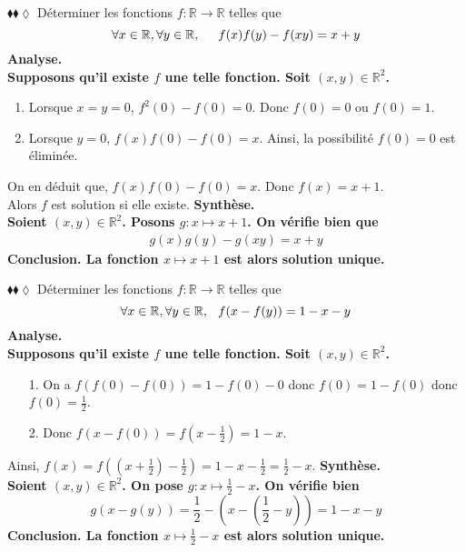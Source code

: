 \documentclass[11pt]{article}
\begin{document}
\begin{exercice}{$\blacklozenge\blacklozenge\lozenge$}{}
    Déterminer les fonctions $f: \mathbb{R} \rightarrow \mathbb{R}$ telles que 
    \begin{equation*}
        \forall{x\in\mathbb{R},\forall{y\in\mathbb{R}}, \hspace{0.5cm} f(x)f(y) - f(xy) = x + y}
    \end{equation*}
    \tcblower
    \bf{Analyse.}\\
    Supposons qu'il existe $f$ une telle fonction. Soit $(x,y)\in\mathbb{R}^2$.
    \begin{enumerate}[topsep=0pt,itemsep=-0.9 ex]
        \item Lorsque $x=y=0$, $f^2(0)-f(0)=0$. Donc $f(0) = 0$ ou $f(0) = 1$.
        \item Lorsque $y=0$, $f(x)f(0)-f(0)=x$. Ainsi, la possibilité $f(0)=0$ est éliminée.
    \end{enumerate}
    On en déduit que, $f(x)f(0)-f(0)=x$. Donc $f(x)=x+1$.\\
    Alors $f$ est solution si elle existe.\n
    \bf{Synthèse.}\\
    Soient $(x,y)\in\mathbb{R}^2$. Posons $g:x\mapsto x+1$. On vérifie bien que
    \begin{align*}
        g(x)g(y)-g(xy)=x+y
    \end{align*}
    \bf{Conclusion.} La fonction $x\mapsto x+1$ est alors solution unique.
\end{exercice}

\begin{exercice}{$\blacklozenge\blacklozenge\lozenge$}{}
    Déterminer les fonctions $f: \mathbb{R} \rightarrow \mathbb{R}$ telles que 
    \begin{equation*}
        \forall{x\in\mathbb{R}},\forall{y\in\mathbb{R}}, \hspace{0.25cm} f(x-f(y)) = 1-x-y
    \end{equation*}
    \tcblower
    \bf{Analyse.}\\
    Supposons qu'il existe $f$ une telle fonction. Soit $(x,y)\in\mathbb{R}^2$.
    \begin{itemize}[topsep=0pt,itemsep=-0.9 ex]
        \item[1.] On a $f(f(0)-f(0))=1-f(0)-0$ donc $f(0)=1-f(0)$ donc $f(0)=\frac{1}{2}$.
        \item[2.] Donc $f(x-f(0))=f(x-\frac{1}{2})=1-x$.
    \end{itemize}
    Ainsi, $f(x)=f((x+\frac{1}{2})-\frac{1}{2})=1-x-\frac{1}{2}=\frac{1}{2}-x$.\n
    \bf{Synthèse.}\\
    Soient $(x,y)\in\mathbb{R}^2$. On pose $g:x\mapsto\frac{1}{2}-x$. On vérifie bien
    \begin{equation*}
        g(x-g(y)) = \frac{1}{2} - (x - (\frac{1}{2}-y)) = 1-x-y
    \end{equation*}
    \bf{Conclusion.} La fonction $x\mapsto\frac{1}{2}-x$ est alors solution unique.
\end{exercice}
\end{document}
